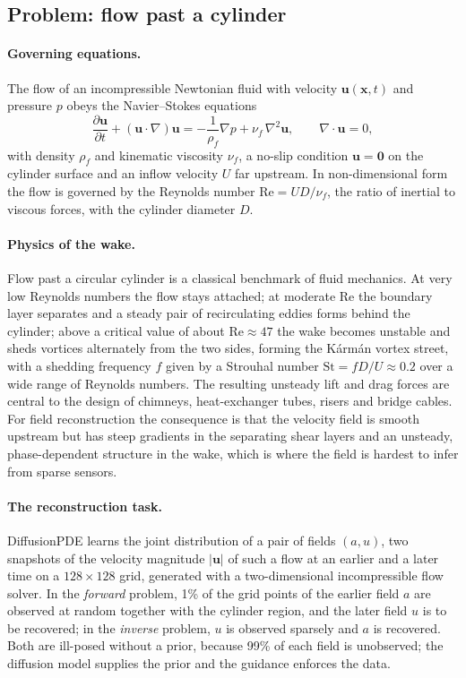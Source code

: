 \subsection{Problem: flow past a cylinder}
\paragraph{Governing equations.} The flow of an incompressible Newtonian fluid with velocity $\mathbf u(\mathbf x,t)$ and pressure $p$ obeys the Navier--Stokes equations
\begin{equation}\label{eq:app-ns}
  \frac{\partial\mathbf u}{\partial t} + (\mathbf u\cdot\nabla)\mathbf u = -\frac{1}{\rho_f}\nabla p + \nu_f\,\nabla^2\mathbf u, \qquad \nabla\cdot\mathbf u = 0,
\end{equation}
with density $\rho_f$ and kinematic viscosity $\nu_f$, a no-slip condition $\mathbf u=\mathbf 0$ on the cylinder surface and an inflow velocity $U$ far upstream. In non-dimensional form the flow is governed by the Reynolds number $\mathrm{Re} = UD/\nu_f$, the ratio of inertial to viscous forces, with the cylinder diameter $D$.

\paragraph{Physics of the wake.} Flow past a circular cylinder is a classical benchmark of fluid mechanics. At very low Reynolds numbers the flow stays attached; at moderate Re the boundary layer separates and a steady pair of recirculating eddies forms behind the cylinder; above a critical value of about $\mathrm{Re}\approx47$ the wake becomes unstable and sheds vortices alternately from the two sides, forming the K\'arm\'an vortex street, with a shedding frequency $f$ given by a Strouhal number $\mathrm{St}=fD/U\approx0.2$ over a wide range of Reynolds numbers. The resulting unsteady lift and drag forces are central to the design of chimneys, heat-exchanger tubes, risers and bridge cables. For field reconstruction the consequence is that the velocity field is smooth upstream but has steep gradients in the separating shear layers and an unsteady, phase-dependent structure in the wake, which is where the field is hardest to infer from sparse sensors.

\paragraph{The reconstruction task.} DiffusionPDE \citep{huang2024diffusionpde} learns the joint distribution of a pair of fields $(a,u)$, two snapshots of the velocity magnitude $|\mathbf u|$ of such a flow at an earlier and a later time on a $128\times128$ grid, generated with a two-dimensional incompressible flow solver. In the \emph{forward} problem, 1\% of the grid points of the earlier field $a$ are observed at random together with the cylinder region, and the later field $u$ is to be recovered; in the \emph{inverse} problem, $u$ is observed sparsely and $a$ is recovered. Both are ill-posed without a prior, because 99\% of each field is unobserved; the diffusion model supplies the prior and the guidance enforces the data.

